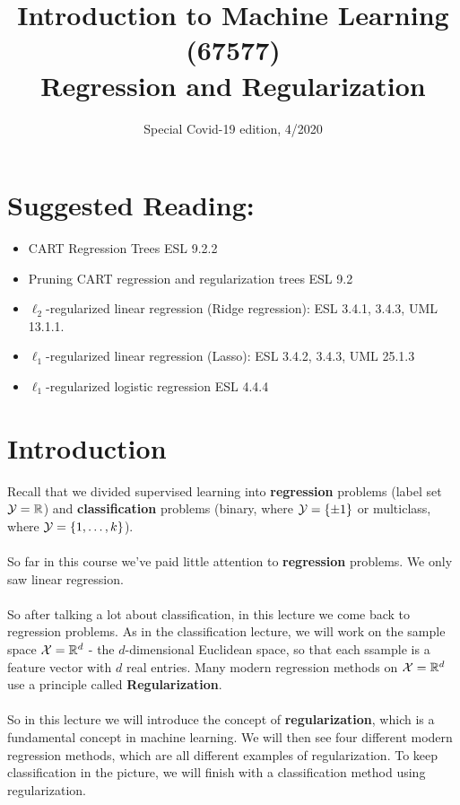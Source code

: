 \documentclass[11pt]{article}
\title{{\large{Introduction to Machine Learning (67577) \\
\vphantom{} Regression and Regularization}}}
\date{Special Covid-19 edition, 4/2020}
\newcommand{\R}{\ensuremath{\mathbb{R}}}
\begin{document}
\maketitle

\tableofcontents

\section*{Suggested Reading:}
\begin{itemize}
  \item CART Regression Trees ESL 9.2.2
  \item Pruning CART regression and regularization trees ESL 9.2
  \item $\ell_2$-regularized linear regression (Ridge regression): ESL 3.4.1,
    3.4.3, UML 13.1.1.
  \item $\ell_1$-regularized linear regression (Lasso): ESL 3.4.2, 3.4.3, UML
    25.1.3
  \item $\ell_1$-regularized logistic regression ESL 4.4.4
\end{itemize}


\section{Introduction}

Recall that we divided supervised learning into {\bf regression} problems 
(label set $\Y=\R$) and {\bf classification} problems (binary, where $\mathcal{Y}=\left\{ \pm 1
\right\}$ or multiclass, where $\mathcal{Y}=\left\{ 1,\ldots, k \right\}$).
\\~\\
So far in this course we've paid little attention to
{\bf regression} problems. We only saw linear regression.
\\~\\
So after talking a lot about classification, in this lecture we come back to
regression problems. As in the classification lecture, we will work on the
sample space $\X=\R^d$ - the $d$-dimensional Euclidean space, so that each
ssample is a feature vector with $d$ real entries. 
Many modern regression methods on $\X=\R^d$ use a principle called {\bf
Regularization}. 
\\~\\
So in this lecture we will introduce the concept of
{\bf regularization}, which is a fundamental concept in machine learning.
We will then see
four different modern regression methods, which are all different examples
of regularization. To keep classification in the picture, we will finish with a
classification method using regularization. 
\end{document}
